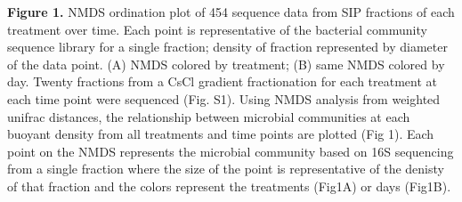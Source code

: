 \textbf{Figure 1.} NMDS ordination plot of 454 sequence data from SIP fractions of each treatment over time. Each point is representative of the bacterial community sequence library for a single fraction; density of fraction represented by diameter of the data point. (A) NMDS colored by treatment; (B) same NMDS colored by day.
Twenty fractions from a CsCl gradient fractionation for each treatment at each time point were sequenced (Fig. S1). Using NMDS analysis from weighted unifrac distances, the relationship between microbial communities at each buoyant density from all treatments and time points are plotted (Fig 1).  Each point on the NMDS represents the microbial community based on 16S sequencing from a single fraction where the size of the point is representative of the denisty of that fraction and the colors represent the treatments (Fig1A) or days (Fig1B).